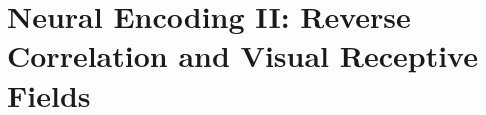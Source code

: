 \chapter{ Neural Encoding II: Reverse Correlation and Visual Receptive Fields}
\label{cha:Neural Encoding II}

\begin{multicols}{2}
\setlength{\columnseprule}{0.2pt}  

















\end{multicols}

